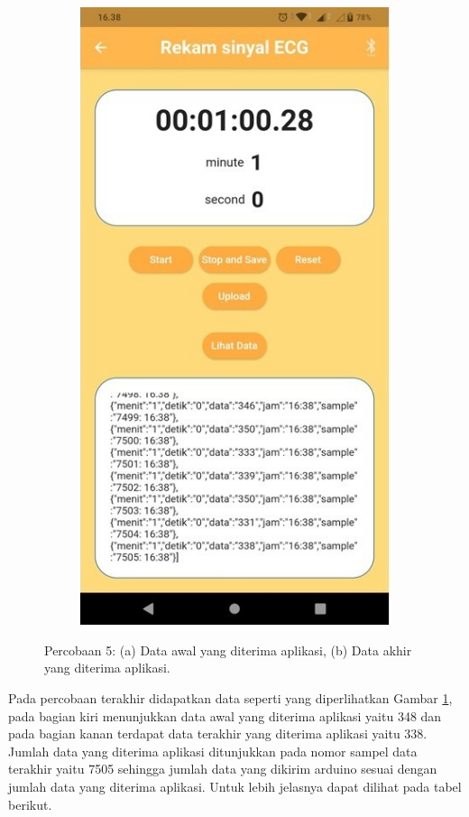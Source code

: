 \begin{figure}[H]
	\begin{subfigure}{0.45\textwidth}
		\centering
		\includegraphics[width=1\linewidth]{img/percob/Slide15b.jpg}	  
		\caption{}		
	\end{subfigure}
	\caption{Percobaan 5: (a) Data awal yang diterima aplikasi, (b) Data akhir yang diterima aplikasi.}
	\label{fig:4.2.8}
\end{figure}
Pada percobaan terakhir didapatkan data seperti yang diperlihatkan Gambar \ref{fig:4.2.8}, pada bagian kiri menunjukkan data awal yang diterima aplikasi yaitu 348 dan pada bagian kanan terdapat data terakhir yang diterima aplikasi yaitu 338. Jumlah data yang diterima aplikasi ditunjukkan pada nomor sampel data terakhir yaitu 7505 sehingga jumlah data yang dikirim arduino sesuai dengan jumlah data yang diterima aplikasi. Untuk lebih jelasnya dapat dilihat pada tabel berikut.

